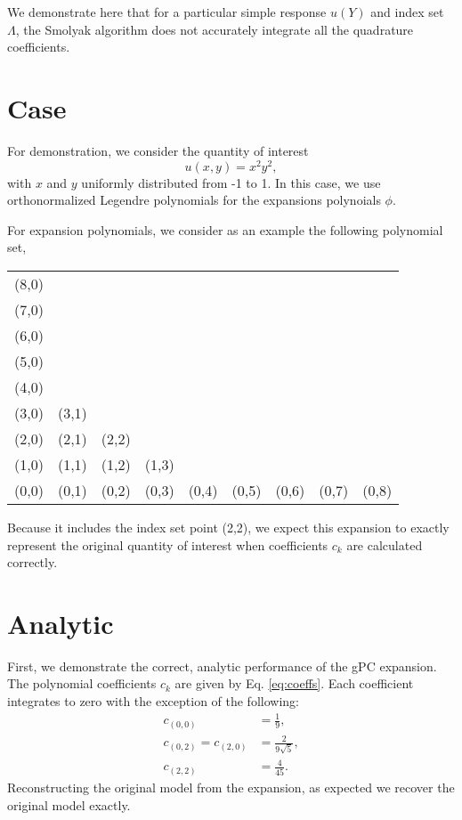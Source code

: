 \documentclass[11pt]{article}
\begin{document}
We demonstrate here that for a particular simple response $u(Y)$ and index set $\Lambda$, the Smolyak algorithm does not accurately
integrate all the quadrature coefficients.

\section{Case}
For demonstration, we consider the quantity of interest
\begin{equation}
  u(x,y) = x^2 y^2,
\end{equation}
with $x$ and $y$ uniformly distributed from -1 to 1.  In this case, we use orthonormalized Legendre
polynomials for the expansions polynoials $\phi$.

For expansion polynomials, we consider as an example the following polynomial set,
\begin{table}[H]
  \centering
  \begin{tabular}{c c c c c c c c c}
    (8,0) &       &       &      &       &       &       &       &      \\
    (7,0) &       &       &      &       &       &       &       &      \\
    (6,0) &       &       &      &       &       &       &       &      \\
    (5,0) &       &       &      &       &       &       &       &      \\
    (4,0) &       &       &      &       &       &       &       &      \\
    (3,0) & (3,1) &       &      &       &       &       &       &      \\
    (2,0) & (2,1) & (2,2) &      &       &       &       &       &      \\
    (1,0) & (1,1) & (1,2) &(1,3) &       &       &       &       &      \\
    (0,0) & (0,1) & (0,2) &(0,3) & (0,4) & (0,5) & (0,6) & (0,7) & (0,8) 
  \end{tabular}
\end{table}
Because it includes the index set point (2,2), we expect this expansion to exactly represent the original
quantity of interest when coefficients $c_k$ are calculated correctly.

\section{Analytic}
First, we demonstrate the correct, analytic performance of the gPC expansion.  The polynomial coefficients
$c_k$ are given by Eq. \ref{eq:coeffs}.  Each coefficient integrates to zero with the exception of the
following:
\begin{align}\label{eq:analytic coeffs}
  c_{(0,0)} &= \frac{1}{9},\\
  c_{(0,2)} = c_{(2,0)} &= \frac{2}{9\sqrt{5}},\\
  c_{(2,2)} &= \frac{4}{45}.
\end{align}
Reconstructing the original model from the expansion, as expected we recover the original model exactly.
\end{document}
